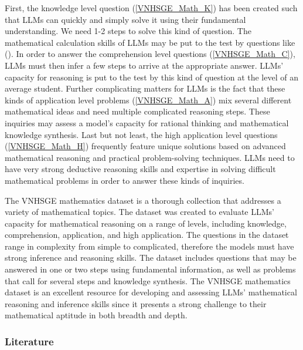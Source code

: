\documentclass{article}
\begin{document}
{	First, the knowledge level question (\ref{VNHSGE_Math_K}) has been created such that LLMs can quickly and simply solve it using their fundamental understanding. We need 1-2 steps to solve this kind of question. The mathematical calculation skills of LLMs may be put to the test by questions like (). In order to answer the comprehension level questions (\ref{VNHSGE_Math_C}), LLMs must then infer a few steps to arrive at the appropriate answer. LLMs' capacity for reasoning is put to the test by this kind of question at the level of an average student. Further complicating matters for LLMs is the fact that these kinds of application level problems (\ref{VNHSGE_Math_A}) mix several different mathematical ideas and need multiple complicated reasoning steps. These inquiries may assess a model's capacity for rational thinking and mathematical knowledge synthesis. Last but not least, the high application level questions (\ref{VNHSGE_Math_H}) frequently feature unique solutions based on advanced mathematical reasoning and practical problem-solving techniques. LLMs need to have very strong deductive reasoning skills and expertise in solving difficult mathematical problems in order to answer these kinds of inquiries.
	
	The VNHSGE mathematics dataset is a thorough collection that addresses a variety of mathematical topics. The dataset was created to evaluate LLMs' capacity for mathematical reasoning on a range of levels, including knowledge, comprehension, application, and high application. The questions in the dataset range in complexity from simple to complicated, therefore the models must have strong inference and reasoning skills. The dataset includes questions that may be answered in one or two steps using fundamental information, as well as problems that call for several steps and knowledge synthesis. The VNHSGE mathematics dataset is an excellent resource for developing and assessing LLMs' mathematical reasoning and inference skills since it presents a strong challenge to their mathematical aptitude in both breadth and depth.
	
	\subsubsection{Literature}
	
}
\end{document}
